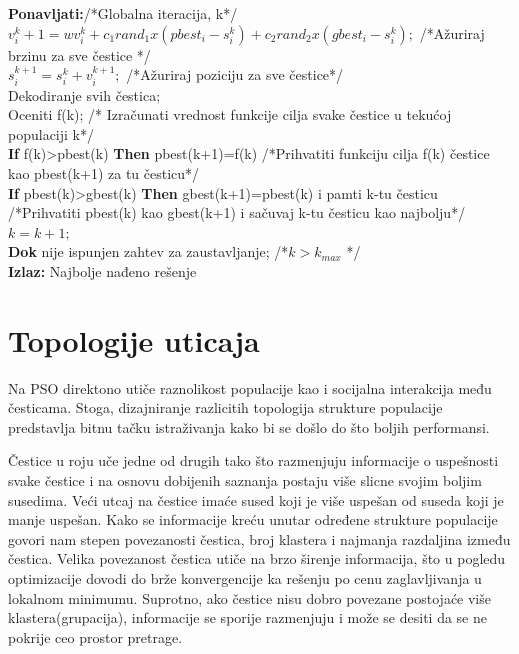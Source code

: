 \documentclass[a4paper]{article}
\begin{document}
\textbf{Ponavljati:}/*Globalna iteracija, k*/ \\
\hspace*{5mm}$v_{i}^k+1 = wv_{i}^k + c_{1}rand_{1} x (pbest_{i} - s_{i}^k) + c_{2}rand_{2} x (gbest_{i} - s_{i}^k);$ /*Ažuriraj brzinu za sve čestice */ \\
\hspace*{5mm}$s_{i}^{k+1} = s_{i}^k + v_{i}^{k+1};$ /*Ažuriraj poziciju za sve čestice*/ \\
\hspace*{5mm}Dekodiranje svih čestica; \\
\hspace*{5mm}Oceniti f(k); /* Izračunati vrednost funkcije cilja svake čestice u tekućoj populaciji k*/ \\
\hspace*{5mm}\textbf{If} f(k)>pbest(k) \textbf{Then} pbest(k+1)=f(k) /*Prihvatiti funkciju cilja f(k) čestice kao pbest(k+1) za tu česticu*/ \\
\hspace*{5mm}\textbf{If} pbest(k)>gbest(k) \textbf{Then} gbest(k+1)=pbest(k) i pamti k-tu česticu  /*Prihvatiti pbest(k) kao gbest(k+1) i sačuvaj k-tu česticu kao najbolju*/ \\
\hspace*{5mm}$k = k+1;$ \\
\textbf{Dok} nije ispunjen zahtev za zaustavljanje; /*$k > k_{max}$  */ \\
\textbf{Izlaz:} Najbolje nađeno rešenje \\

\section{Topologije uticaja}
Na PSO direktono utiče raznolikost populacije kao i socijalna interakcija među česticama. Stoga, dizajniranje razlicitih topologija strukture populacije predstavlja bitnu tačku istraživanja kako bi se došlo do što boljih performansi.

Čestice u roju uče jedne od drugih tako što razmenjuju informacije o uspešnosti svake čestice i na osnovu dobijenih saznanja postaju više slicne svojim boljim susedima. Veći utcaj na čestice imaće sused koji je više uspešan od suseda koji je manje uspešan. Kako se informacije kreću unutar određene strukture populacije govori nam stepen povezanosti čestica, broj klastera i najmanja razdaljina između čestica. Velika povezanost čestica utiče na brzo širenje informacija, što u pogledu optimizacije dovodi do brže konvergencije ka rešenju po cenu zaglavljivanja u lokalnom minimumu. Suprotno, ako čestice nisu dobro povezane postojaće više klastera(grupacija), informacije se sporije razmenjuju i može se desiti da se ne pokrije ceo prostor pretrage.
\end{document}
